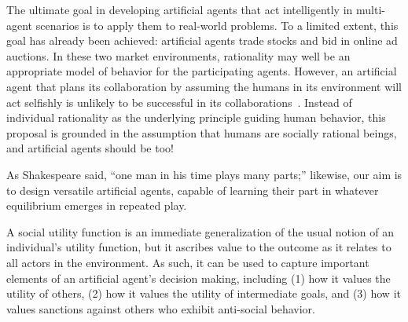 The ultimate goal in developing artificial agents that act
intelligently in multi-agent scenarios is to apply them to real-world
problems.  To a limited extent, this goal has already been achieved:
artificial agents trade stocks and bid in online ad auctions.  In
these two market environments, rationality may well be an appropriate
model of behavior for the participating agents.  However,
an artificial agent that plans its collaboration by assuming the
humans in its environment will act selfishly is unlikely to be
successful in its collaborations~\cite{Camerer:2003,kahnemanst82}.
Instead of individual rationality as the underlying principle guiding
human behavior, this proposal is grounded in the assumption that
humans are socially rational beings, and artificial agents should be
too!  


As Shakespeare said, ``one man in his time plays many parts;''
likewise, our aim is to design versatile artificial agents, capable of learning
their part in whatever equilibrium emerges in repeated play.

A social utility function is an immediate generalization of the usual
notion of an individual's utility function, but it ascribes value to
the outcome as it relates to all actors in the environment.
%
%
As such, it can be used to capture important elements of an artificial
agent's decision making, including (1) how it values the utility of
others, (2) how it values the utility of intermediate goals, and (3)
how it values sanctions against others who exhibit anti-social behavior.
